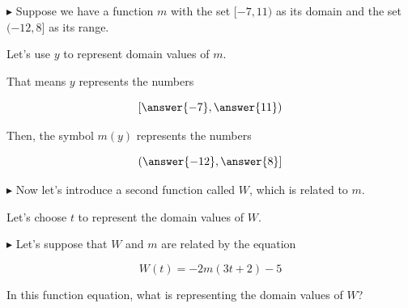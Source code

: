 \documentclass{ximera}
\begin{document}
\begin{example}




\textbf{\textcolor{blue!55!black}{$\blacktriangleright$}}  Suppose we have a function $m$ with the set $[-7, 11)$ as its domain and the set $(-12, 8]$ as its range. 

Let's use $y$ to represent domain values of $m$.  



\begin{question}

That means $y$ represents the numbers 

\[
\left[ \answer{-7}, \answer{11} \right)
\]

\end{question}





\begin{question}

Then, the symbol $m(y)$ represents the numbers

\[
\left( \answer{-12}, \answer{8} \right]
\]

\end{question}




\textbf{\textcolor{blue!55!black}{$\blacktriangleright$}} Now let's introduce a second function called $W$, which is related to $m$. 

Let's choose $t$ to represent the domain values of $W$. 


\textbf{\textcolor{blue!55!black}{$\blacktriangleright$}} Let's suppose that $W$ and $m$ are related by the equation 

\[ 
W(t) = -2 m(3t + 2) - 5
\]





\begin{question}

In this function equation, what is representing the domain values of $W$?

\begin{multipleChoice}
\end{multipleChoice}

\end{question}




\begin{question}


\end{question}
\end{example}
\end{document}

